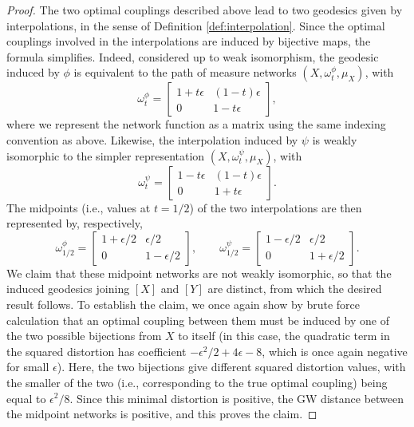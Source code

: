 \documentclass{article}
\theoremstyle{definition}
\begin{document}
\begin{proof}
The two optimal couplings described above lead to two geodesics given by interpolations, in the sense of Definition \ref{def:interpolation}. Since the optimal couplings involved in the interpolations are induced by bijective maps, the formula simplifies. Indeed, considered up to weak isomorphism, the geodesic induced by $\phi$ is equivalent to the path of measure networks $(X,\omega_t^\phi,\mu_X)$, with 
\[
\omega_t^\phi = \begin{bmatrix}
    1+ t \epsilon & (1-t)\epsilon \\
    0 & 1-t\epsilon 
\end{bmatrix},
\]
where we represent the network function as a matrix using the same indexing convention as above. Likewise, the interpolation induced by $\psi$ is weakly isomorphic to the simpler representation $(X,\omega_t^\psi,\mu_X)$, with 
\[
\omega_t^\psi = \begin{bmatrix}
    1-t \epsilon & (1-t)\epsilon \\
    0 & 1+t\epsilon
\end{bmatrix}.
\]
The midpoints (i.e., values at $t=1/2$) of the two interpolations are then represented by, respectively,
    \[
    \omega^\phi_{1/2} = \begin{bmatrix}
        1+\epsilon/2 & \epsilon/2 \\
        0 & 1-\epsilon/2
    \end{bmatrix}, \qquad \omega^\psi_{1/2} = \begin{bmatrix}
        1- \epsilon/2 & \epsilon/2 \\
        0 & 1+\epsilon/2
    \end{bmatrix}.
    \]
We claim that these midpoint networks are not weakly isomorphic, so that the induced geodesics joining $[X]$ and $[Y]$ are distinct, from which the desired result follows. To establish the claim, we once again show by brute force calculation that an optimal coupling between them must be induced by one of the two possible bijections from $X$ to itself (in this case, the quadratic term in the squared distortion has coefficient $-\epsilon^2/2 + 4 \epsilon - 8$, which is once again negative for small $\epsilon$). Here, the two bijections give different squared distortion values, with the smaller of the two (i.e., corresponding to the true optimal coupling) being equal to $\epsilon^2/8$. Since this minimal distortion is positive, the GW distance between the midpoint networks is positive, and this proves the claim.
\end{proof}
\end{document}
